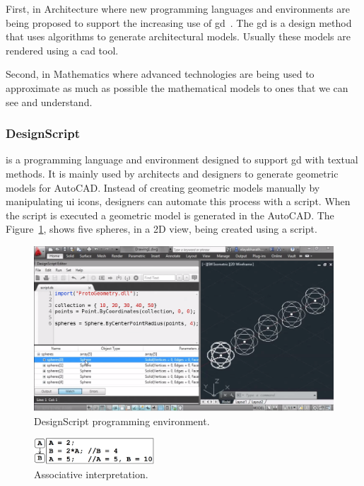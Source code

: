 First, in Architecture where new programming languages and environments are being proposed to support the increasing use of \ac{gd}~\cite{mccormack2004generative}. The \ac{gd} is a design method that uses algorithms to generate architectural models. Usually these models are rendered using a \ac{cad} tool. 

Second, in Mathematics where advanced technologies are being used to approximate as much as possible the mathematical models to ones that we can see and understand.

\subsubsection{DesignScript~\cite{aish2012designscript}} is a programming language and environment designed to support \ac{gd} with textual methods. It is mainly used by architects and designers to generate geometric models for AutoCAD. Instead of creating geometric models manually by manipulating \ac{ui} icons, designers can automate this process with a script. When the script is executed a geometric model is generated in the AutoCAD. The Figure~\ref{fig:ds}, shows five spheres, in a 2D view, being created using a script.

\begin{figure}[!htbp]
  \centering
  \includegraphics[width=1.0\textwidth]{img/designScriptIDE}
    \caption{DesignScript programming environment.}  
  \label{fig:ds}
\end{figure} 


\begin{figure}
  \vspace{-25pt}
  \begin{center}
    \includegraphics[width=0.4\textwidth]{img/designscript}
  \end{center}
  \vspace{-20pt}
 \caption{Associative interpretation.}  
  \vspace{-20pt}
    \label{fig:designscript}
\end{figure}

